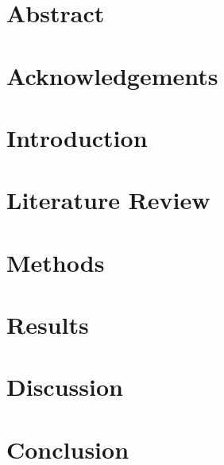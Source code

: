\documentclass[a4paper]{book}
\begin{document}
\chapter{Abstract}

\chapter{Acknowledgements}

\tableofcontents

\chapter{Introduction}

\chapter{Literature Review}

\chapter{Methods}

\chapter{Results}

\chapter{Discussion}

\chapter{Conclusion}
\end{document}
